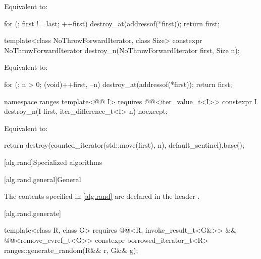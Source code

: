 \begin{itemdescr}
\pnum
\effects
Equivalent to:
\begin{codeblock}
for (; first != last; ++first)
  destroy_at(addressof(*first));
return first;
\end{codeblock}
\end{itemdescr}

%
\begin{itemdecl}
template<class NoThrowForwardIterator, class Size>
  constexpr NoThrowForwardIterator destroy_n(NoThrowForwardIterator first, Size n);
\end{itemdecl}

\begin{itemdescr}
\pnum
\effects
Equivalent to:
\begin{codeblock}
for (; n > 0; (void)++first, --n)
  destroy_at(addressof(*first));
return first;
\end{codeblock}
\end{itemdescr}

%
\begin{itemdecl}
namespace ranges {
  template<@@ I>
    requires @@<iter_value_t<I>>
    constexpr I destroy_n(I first, iter_difference_t<I> n) noexcept;
}
\end{itemdecl}

\begin{itemdescr}
\pnum
\effects
Equivalent to:
\begin{codeblock}
return destroy(counted_iterator(std::move(first), n), default_sentinel).base();
\end{codeblock}
\end{itemdescr}

[alg.rand]{Specialized  algorithms}

[alg.rand.general]{General}

\pnum
The contents specified in \ref{alg.rand}
are declared in the header .

[alg.rand.generate]{}

%
\begin{itemdecl}
template<class R, class G>
  requires @@<R, invoke_result_t<G&>> && @@<remove_cvref_t<G>>
constexpr borrowed_iterator_t<R> ranges::generate_random(R&& r, G&& g);
\end{itemdecl}

